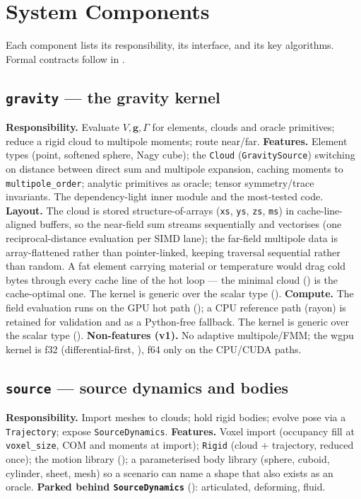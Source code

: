 \documentclass[11pt,a4paper]{article}
\theoremstyle{reqstyle}
\begin{document}
\section{System Components}
\label{sec:components}

Each component lists its responsibility, its interface, and its key algorithms. Formal
contracts follow in .

\subsection{\texttt{gravity} --- the gravity kernel}
\textbf{Responsibility.} Evaluate $V,\mathbf g,\Gamma$ for elements, clouds and oracle
primitives; reduce a rigid cloud to multipole moments; route near/far.
\textbf{Features.} Element types (point, softened sphere, Nagy cube); the \texttt{Cloud}
(\texttt{GravitySource}) switching on distance between direct sum and multipole expansion,
caching moments to \texttt{multipole\_order}; analytic primitives as oracle; tensor
symmetry/trace invariants. The dependency-light inner module and the most-tested code.
\textbf{Layout.} The cloud is stored structure-of-arrays (\texttt{xs}, \texttt{ys},
\texttt{zs}, \texttt{ms}) in cache-line-aligned buffers, so the near-field sum streams
sequentially and vectorises (one reciprocal-distance evaluation per SIMD lane); the far-field
multipole data is array-flattened rather than pointer-linked, keeping traversal sequential
rather than random. A fat element carrying material or temperature would drag cold bytes
through every cache line of the hot loop --- the minimal cloud () is the
cache-optimal one. The kernel is generic over the scalar type ().
\textbf{Compute.} The field evaluation runs on the GPU hot path (); a
CPU reference path (rayon) is retained for validation and as a Python-free fallback. The
kernel is generic over the scalar type ().
\textbf{Non-features (v1).} No adaptive multipole/FMM; the wgpu kernel is f32
(differential-first, ), f64 only on the CPU/CUDA paths.

\subsection{\texttt{source} --- source dynamics and bodies}
\textbf{Responsibility.} Import meshes to clouds; hold rigid bodies; evolve pose via a
\texttt{Trajectory}; expose \texttt{SourceDynamics}.
\textbf{Features.} Voxel import (occupancy fill at \texttt{voxel\_size}, COM and moments at
import); \texttt{Rigid} (cloud $+$ trajectory, reduced once); the motion library
(); a parameterised body library (sphere, cuboid, cylinder, sheet, mesh) so
a scenario can name a shape that also exists as an oracle.
\textbf{Parked behind \texttt{SourceDynamics}} (): articulated, deforming,
fluid.
\end{document}
